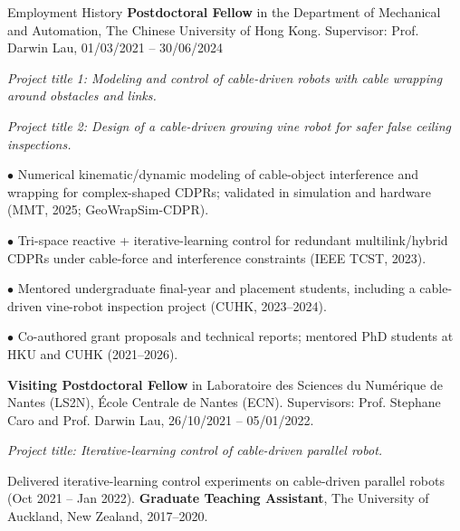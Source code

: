 \begin{rubric}{Employment History}
    \entry*[2021 -- 2024]%
        \textbf{Postdoctoral Fellow} in the Department of Mechanical and Automation, The Chinese University of Hong Kong. Supervisor: Prof. Darwin Lau, 01/03/2021 -- 30/06/2024
     \par \textit{Project title 1: Modeling and control of cable-driven robots with cable wrapping around obstacles and links.}
     
     \par \textit{Project title 2: Design of a cable-driven growing vine robot for safer false ceiling inspections.}

     \par $\bullet$ Numerical kinematic/dynamic modeling of cable-object interference and wrapping for complex-shaped CDPRs; validated in simulation and hardware (MMT, 2025; GeoWrapSim-CDPR).
     \par $\bullet$ Tri-space reactive + iterative-learning control for redundant multilink/hybrid CDPRs under cable-force and interference constraints (IEEE TCST, 2023).
     \par $\bullet$ Mentored undergraduate final-year and placement students, including a cable-driven vine-robot inspection project (CUHK, 2023--2024).
     \par $\bullet$ Co-authored grant proposals and technical reports; mentored PhD students at HKU and CUHK (2021--2026).
    
    
     
    \entry*[2021 -- 2022]%
        \textbf{Visiting Postdoctoral Fellow} in Laboratoire des Sciences du Numérique de Nantes (LS2N), École Centrale de Nantes (ECN). Supervisors: Prof. Stephane Caro and Prof. Darwin Lau, 26/10/2021 -- 05/01/2022.
        \par \textit{Project title: Iterative-learning control of cable-driven parallel robot.}
        \par Delivered iterative-learning control experiments on cable-driven parallel robots (Oct 2021 -- Jan 2022).
    \entry*[2017 -- 2020]%
        \textbf{Graduate Teaching Assistant}, The University of Auckland, New Zealand, 2017--2020.
    

\end{rubric}
